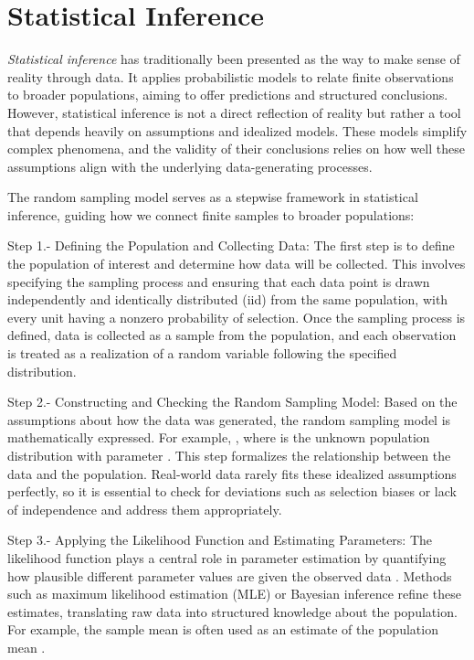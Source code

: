 %
%

\section{Statistical Inference}

\emph{Statistical inference} has traditionally been presented as the way to make sense of reality through data. It applies probabilistic models to relate finite observations to broader populations, aiming to offer predictions and structured conclusions. However, statistical inference is not a direct reflection of reality but rather a tool that depends heavily on assumptions and idealized models. These models simplify complex phenomena, and the validity of their conclusions relies on how well these assumptions align with the underlying data-generating processes.

The random sampling model serves as a stepwise framework in statistical inference, guiding how we connect finite samples to broader populations:

Step 1.- Defining the Population and Collecting Data: The first step is to define the population of interest and determine how data will be collected. This involves specifying the sampling process and ensuring that each data point is drawn independently and identically distributed (iid) from the same population, with every unit having a nonzero probability of selection. Once the sampling process is defined, data is collected as a sample from the population, and each observation is treated as a realization of a random variable following the specified distribution.

Step 2.- Constructing and Checking the Random Sampling Model: Based on the assumptions about how the data was generated, the random sampling model is mathematically expressed. For example, , where  is the unknown population distribution with parameter . This step formalizes the relationship between the data and the population. Real-world data rarely fits these idealized assumptions perfectly, so it is essential to check for deviations such as selection biases or lack of independence and address them appropriately.

Step 3.- Applying the Likelihood Function and Estimating Parameters: The likelihood function plays a central role in parameter estimation by quantifying how plausible different parameter values are given the observed data . Methods such as maximum likelihood estimation (MLE) or Bayesian inference refine these estimates, translating raw data into structured knowledge about the population. For example, the sample mean  is often used as an estimate of the population mean .

